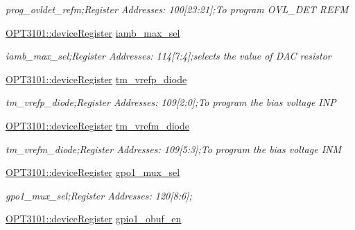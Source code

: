 \begin{DoxyCompactItemize}
\begin{DoxyCompactList}\small\item\em prog\+\_\+ovldet\+\_\+refm;Register Addresses\+: 100\mbox{[}23\+:21\mbox{]};To program O\+V\+L\+\_\+\+D\+ET R\+E\+FM \end{DoxyCompactList}\item 
\mbox{\hyperlink{class_o_p_t3101_1_1device_register}{O\+P\+T3101\+::device\+Register}} \mbox{\hyperlink{class_o_p_t3101_1_1registers_a328356a6de5554db76c6f85b26e1aac4}{iamb\+\_\+max\+\_\+sel}}
\begin{DoxyCompactList}\small\item\em iamb\+\_\+max\+\_\+sel;Register Addresses\+: 114\mbox{[}7\+:4\mbox{]};selects the value of D\+AC resistor \end{DoxyCompactList}\item 
\mbox{\hyperlink{class_o_p_t3101_1_1device_register}{O\+P\+T3101\+::device\+Register}} \mbox{\hyperlink{class_o_p_t3101_1_1registers_abe55d5504aa2cdceab7586e85926d607}{tm\+\_\+vrefp\+\_\+diode}}
\begin{DoxyCompactList}\small\item\em tm\+\_\+vrefp\+\_\+diode;Register Addresses\+: 109\mbox{[}2\+:0\mbox{]};To program the bias voltage I\+NP \end{DoxyCompactList}\item 
\mbox{\hyperlink{class_o_p_t3101_1_1device_register}{O\+P\+T3101\+::device\+Register}} \mbox{\hyperlink{class_o_p_t3101_1_1registers_a5d168998fa7b8866919cc41cafde1356}{tm\+\_\+vrefm\+\_\+diode}}
\begin{DoxyCompactList}\small\item\em tm\+\_\+vrefm\+\_\+diode;Register Addresses\+: 109\mbox{[}5\+:3\mbox{]};To program the bias voltage I\+NM \end{DoxyCompactList}\item 
\mbox{\hyperlink{class_o_p_t3101_1_1device_register}{O\+P\+T3101\+::device\+Register}} \mbox{\hyperlink{class_o_p_t3101_1_1registers_a5249126def563a037c9db68539a49775}{gpo1\+\_\+mux\+\_\+sel}}
\begin{DoxyCompactList}\small\item\em gpo1\+\_\+mux\+\_\+sel;Register Addresses\+: 120\mbox{[}8\+:6\mbox{]}; \end{DoxyCompactList}\item 
\mbox{\hyperlink{class_o_p_t3101_1_1device_register}{O\+P\+T3101\+::device\+Register}} \mbox{\hyperlink{class_o_p_t3101_1_1registers_aaae22c5096e95c010520ac9e810540b1}{gpio1\+\_\+obuf\+\_\+en}}

\end{DoxyCompactItemize}
